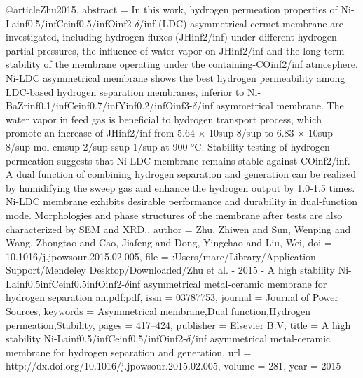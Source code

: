 @article{Zhu2015,
abstract = {In this work, hydrogen permeation properties of Ni-Lainf0.5/infCeinf0.5/infOinf2-$\delta$/inf (LDC) asymmetrical cermet membrane are investigated, including hydrogen fluxes (JHinf2/inf) under different hydrogen partial pressures, the influence of water vapor on JHinf2/inf and the long-term stability of the membrane operating under the containing-COinf2/inf atmosphere. Ni-LDC asymmetrical membrane shows the best hydrogen permeability among LDC-based hydrogen separation membranes, inferior to Ni-BaZrinf0.1/infCeinf0.7/infYinf0.2/infOinf3-$\delta$/inf asymmetrical membrane. The water vapor in feed gas is beneficial to hydrogen transport process, which promote an increase of JHinf2/inf from 5.64 × 10sup-8/sup to 6.83 × 10sup-8/sup mol cmsup-2/sup ssup-1/sup at 900 °C. Stability testing of hydrogen permeation suggests that Ni-LDC membrane remains stable against COinf2/inf. A dual function of combining hydrogen separation and generation can be realized by humidifying the sweep gas and enhance the hydrogen output by 1.0-1.5 times. Ni-LDC membrane exhibits desirable performance and durability in dual-function mode. Morphologies and phase structures of the membrane after tests are also characterized by SEM and XRD.},
author = {Zhu, Zhiwen and Sun, Wenping and Wang, Zhongtao and Cao, Jiafeng and Dong, Yingchao and Liu, Wei},
doi = {10.1016/j.jpowsour.2015.02.005},
file = {:Users/marc/Library/Application Support/Mendeley Desktop/Downloaded/Zhu et al. - 2015 - A high stability Ni-Lainf0.5infCeinf0.5infOinf2-$\delta$inf asymmetrical metal-ceramic membrane for hydrogen separation an.pdf:pdf},
issn = {03787753},
journal = {Journal of Power Sources},
keywords = {Asymmetrical membrane,Dual function,Hydrogen permeation,Stability},
pages = {417--424},
publisher = {Elsevier B.V},
title = {{A high stability Ni-Lainf0.5/infCeinf0.5/infOinf2-$\delta$/inf asymmetrical metal-ceramic membrane for hydrogen separation and generation}},
url = {http://dx.doi.org/10.1016/j.jpowsour.2015.02.005},
volume = {281},
year = {2015}
}
